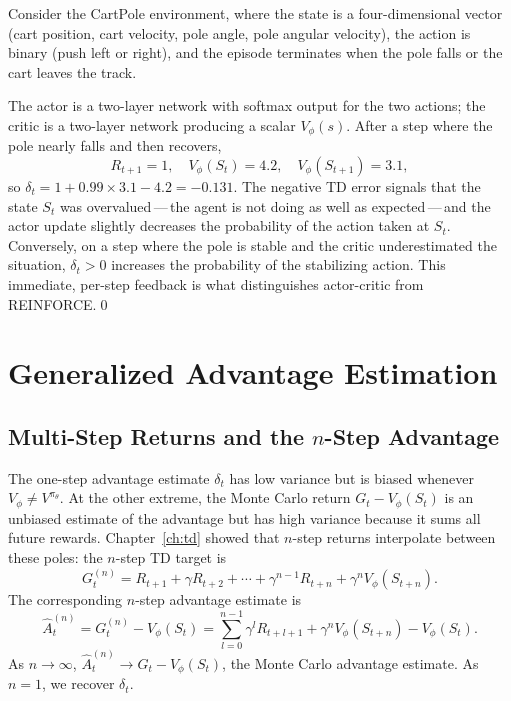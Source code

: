\begin{example}
\label{ex:cartpole-ac}
Consider the CartPole environment, where the state is a four-dimensional
vector (cart position, cart velocity, pole angle, pole angular velocity),
the action is binary (push left or right), and the episode terminates when
the pole falls or the cart leaves the track.

The actor is a two-layer network with softmax output for the two actions;
the critic is a two-layer network producing a scalar $V_\phi(s)$.  After a
step where the pole nearly falls and then recovers,
\[
R_{t+1} = 1,\quad V_\phi(S_t) = 4.2,\quad V_\phi(S_{t+1}) = 3.1,
\]
so $\delta_t = 1 + 0.99 \times 3.1 - 4.2 = -0.131$.  The negative TD error
signals that the state $S_t$ was overvalued\,---\,the agent is not doing as
well as expected\,---\,and the actor update slightly decreases the
probability of the action taken at $S_t$.  Conversely, on a step where the
pole is stable and the critic underestimated the situation,
$\delta_t > 0$ increases the probability of the stabilizing action.  This
immediate, per-step feedback is what distinguishes actor-critic from
REINFORCE.\qed
\end{example}

\section{Generalized Advantage Estimation}
\label{sec:gae}

\subsection{Multi-Step Returns and the $n$-Step Advantage}

The one-step advantage estimate $\delta_t$ has low variance but is biased
whenever $V_\phi \neq V^{\pi_\theta}$.  At the other extreme, the Monte Carlo
return $G_t - V_\phi(S_t)$ is an unbiased estimate of the advantage but has
high variance because it sums all future rewards.  Chapter~\ref{ch:td}
showed that $n$-step returns interpolate between these poles: the
$n$-step TD target is
\[
G_t^{(n)} = R_{t+1} + \gamma R_{t+2} + \cdots + \gamma^{n-1}R_{t+n}
             + \gamma^n V_\phi(S_{t+n}).
\]
The corresponding $n$-step advantage estimate is
\begin{equation}
\label{eq:n-step-advantage}
\hat{A}_t^{(n)}
= G_t^{(n)} - V_\phi(S_t)
= \sum_{l=0}^{n-1} \gamma^l R_{t+l+1} + \gamma^n V_\phi(S_{t+n})
  - V_\phi(S_t).
\end{equation}
As $n \to \infty$, $\hat{A}_t^{(n)} \to G_t - V_\phi(S_t)$, the Monte Carlo
advantage estimate.  As $n = 1$, we recover $\delta_t$.

